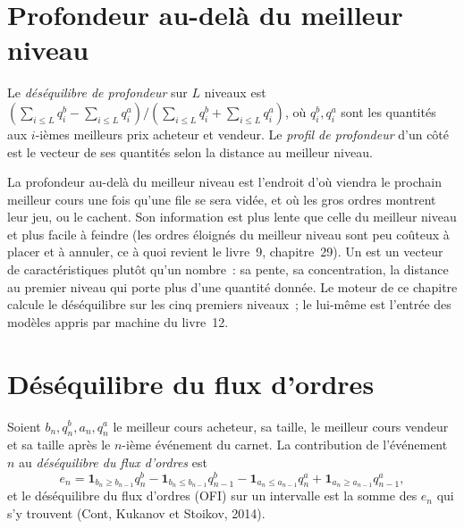 \section{Profondeur au-delà du meilleur niveau}

\begin{definition}\label{def:rs:order-book-features:depth}
Le \emph{déséquilibre de profondeur} sur $L$ niveaux est $(\sum_{i \le L}q^b_i - \sum_{i \le L}q^a_i)/(\sum_{i\le L}q^b_i
+ \sum_{i \le L}q^a_i)$, où $q^b_i, q^a_i$ sont les quantités aux $i$-ièmes meilleurs prix acheteur et vendeur. Le \emph{profil de profondeur}%
 d'un côté est le vecteur de ses quantités selon la distance au meilleur niveau.
\end{definition}

La profondeur au-delà du meilleur niveau est l'endroit d'où viendra le prochain meilleur cours une fois qu'une file se sera vidée, et où les gros ordres montrent leur jeu, ou
le cachent. Son information est plus lente que celle du meilleur niveau et plus facile à feindre (les ordres éloignés du meilleur niveau sont peu coûteux à placer et à annuler, ce à quoi
revient le livre~9, chapitre~29). Un  est un vecteur de caractéristiques plutôt qu'un nombre~: sa pente, sa concentration, la
distance au premier niveau qui porte plus d'une quantité donnée. Le moteur de ce chapitre calcule le déséquilibre sur les cinq
premiers niveaux~; le  lui-même est l'entrée des modèles appris par machine du livre~12.

\section{Déséquilibre du flux d'ordres}

\begin{definition}\label{def:rs:order-book-features:ofi}
Soient $b_n, q^b_n, a_n, q^a_n$ le meilleur cours acheteur, sa taille, le meilleur cours vendeur et sa taille après le $n$-ième événement du carnet. La contribution de l'événement $n$ au \emph{déséquilibre du flux
d'ordres} est
\[
e_n = \mathbf 1_{b_n \ge b_{n-1}}q^b_n - \mathbf 1_{b_n \le b_{n-1}}q^b_{n-1} - \mathbf 1_{a_n \le a_{n-1}}q^a_n + \mathbf 1_{a_n \ge
a_{n-1}}q^a_{n-1},
\]
et le déséquilibre du flux d'ordres (OFI) sur un intervalle est la somme des $e_n$ qui s'y trouvent (Cont, Kukanov et Stoikov, 2014).
\end{definition}

